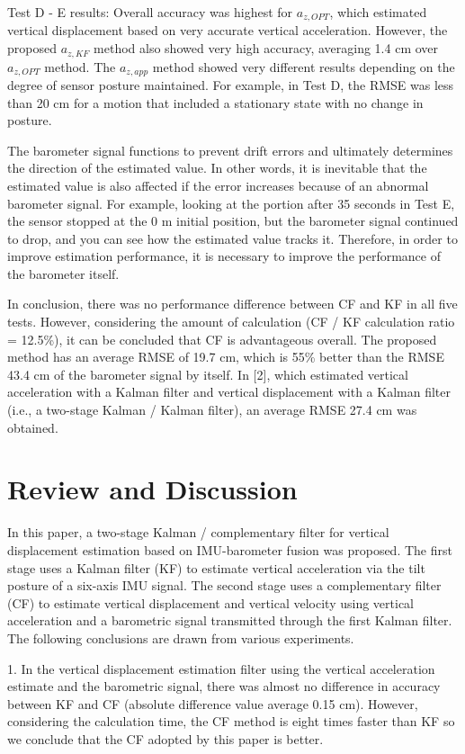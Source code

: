 \documentclass[10pt,journal,compsoc]{IEEEtran}
\begin{document}
Test D - E results: Overall accuracy was highest for $a_{z,OPT}$, which estimated
vertical displacement based on very accurate vertical acceleration. However,
the proposed $a_{z,KF}$ method also showed very high accuracy,
averaging 1.4 cm over $a_{z,OPT}$ method.  The $a_{z,app}$ method showed very
different results depending on the degree of sensor posture maintained.  For
example, in Test D, the RMSE was less than 20 cm for a motion
that included a stationary state with no change in posture.

The barometer signal functions to prevent drift errors and ultimately
determines the direction of the estimated value. In other words, it is
inevitable that the estimated value is also affected if the error increases because
of an abnormal barometer signal.  For example, looking at the portion after
35 seconds in Test E, the sensor stopped at the 0 m initial position, but the
barometer signal continued to drop, and you can see how the estimated value
tracks it.  Therefore, in order to improve estimation performance, it is
necessary to improve the performance of the barometer itself.

In conclusion, there was no performance difference between CF and KF in all
five tests.  However, considering the amount of calculation (CF / KF
calculation ratio = 12.5\%), it can be concluded that CF is advantageous
overall. The proposed method has an average RMSE of 19.7 cm, which is 55\%
better than the RMSE 43.4 cm of the barometer signal by itself.  In [2], which
estimated vertical acceleration with a Kalman filter and vertical displacement
with a Kalman filter (i.e., a two-stage Kalman / Kalman filter), an average RMSE
27.4 cm was obtained.

\section{Review and Discussion}

In this paper, a two-stage Kalman / complementary filter for vertical
displacement estimation based on IMU-barometer fusion was proposed. The first
stage uses a Kalman filter (KF) to estimate vertical acceleration
via the tilt posture of a six-axis IMU signal. The second stage
uses a complementary filter (CF) to estimate vertical displacement and vertical
velocity using vertical acceleration and a barometric signal
transmitted through the first Kalman filter. The following conclusions are
drawn from various experiments.

1. In the vertical displacement estimation filter using the vertical
acceleration estimate and the barometric signal, there was almost no difference
in accuracy between KF and CF (absolute difference value average 0.15 cm).
However, considering the calculation time, the CF method is eight times faster than KF
so we conclude that the CF adopted by this paper is better.
\end{document}
